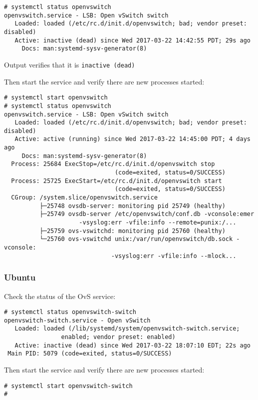 \documentclass[letter]{article}
\begin{document}
{{\begin{appendices}
{\begin{lstlisting}
# systemctl status openvswitch
openvswitch.service - LSB: Open vSwitch switch
   Loaded: loaded (/etc/rc.d/init.d/openvswitch; bad; vendor preset: disabled)
   Active: inactive (dead) since Wed 2017-03-22 14:42:55 PDT; 29s ago
     Docs: man:systemd-sysv-generator(8)
\end{lstlisting}

Output verifies that it is \texttt{inactive (dead)}

Then start the service and verify there are new processes started:

\begin{lstlisting}
# systemctl start openvswitch
# systemctl status openvswitch
openvswitch.service - LSB: Open vSwitch switch
   Loaded: loaded (/etc/rc.d/init.d/openvswitch; bad; vendor preset: disabled)
   Active: active (running) since Wed 2017-03-22 14:45:00 PDT; 4 days ago
     Docs: man:systemd-sysv-generator(8)
  Process: 25684 ExecStop=/etc/rc.d/init.d/openvswitch stop 
                               (code=exited, status=0/SUCCESS)
  Process: 25725 ExecStart=/etc/rc.d/init.d/openvswitch start 
                               (code=exited, status=0/SUCCESS)
  CGroup: /system.slice/openvswitch.service
          ├─25748 ovsdb-server: monitoring pid 25749 (healthy)
          ├─25749 ovsdb-server /etc/openvswitch/conf.db -vconsole:emer 
                     -vsyslog:err -vfile:info --remote=punix:/...
          ├─25759 ovs-vswitchd: monitoring pid 25760 (healthy)
          └─25760 ovs-vswitchd unix:/var/run/openvswitch/db.sock -vconsole: 
                              -vsyslog:err -vfile:info --mlock...

\end{lstlisting}

\subsubsection{Ubuntu}
Check the status of the OvS service:
\begin{lstlisting}
# systemctl status openvswitch-switch
openvswitch-switch.service - Open vSwitch
   Loaded: loaded (/lib/systemd/system/openvswitch-switch.service; 
				enabled; vendor preset: enabled)
   Active: inactive (dead) since Wed 2017-03-22 18:07:10 EDT; 22s ago
 Main PID: 5079 (code=exited, status=0/SUCCESS)
\end{lstlisting}
Then start the service and verify there are new processes started:
\begin{lstlisting}
# systemctl start openvswitch-switch
# 
\end{lstlisting}

}
\end{appendices}}}
\end{document}

